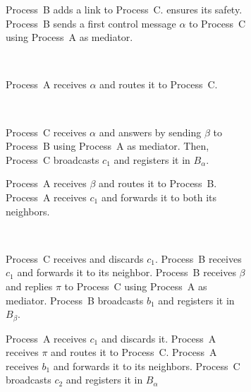 \begin{figure}
  \begin{center}
    \begin{subfigure}[t]{0.31\textwidth}
      \centering%
      \caption{\label{fig:solveA}Process~B adds a link to
        Process~C. \RPCBROADCAST ensures its safety. Process~B sends a first
        control message $\alpha$ to Process~C using Process~A as mediator.}
    \end{subfigure}
    ~
    \begin{subfigure}[t]{0.31\textwidth}
      \centering%
      \caption{\label{fig:solveB}Process~A receives $\alpha$ and routes it to
        Process~C.}
    \end{subfigure}
    ~
    \begin{subfigure}[t]{0.31\textwidth}
      \centering%
      \caption{\label{fig:solveC}Process~C receives $\alpha$ and answers by
        sending $\beta$ to Process~B using Process~A as mediator. Then,
        Process~C broadcasts $c_1$ and registers it in $B_\alpha$.}
    \end{subfigure}
    \begin{subfigure}[t]{0.48\textwidth}
      \centering%
      \caption{\label{fig:solveD}Process~A receives $\beta$ and routes it to
        Process~B.  Process~A receives $c_1$ and forwards it to both its
        neighbors.}
    \end{subfigure}
    ~
    \begin{subfigure}[t]{0.48\textwidth}
      \centering%
      \caption{\label{fig:solveE}Process~C receives and discards $c_1$.
        Process~B receives $c_1$ and forwards it to its neighbor.  Process~B
        receives $\beta$ and replies $\pi$ to Process~C using Process~A as
        mediator. Process~B broadcasts $b_1$ and registers it in $B_\beta$.}
    \end{subfigure}    
    \begin{subfigure}[t]{0.48\textwidth}
      \centering%
      \caption{\label{fig:solveF}Process~A receives $c_1$ and discards it.
        Process~A receives $\pi$ and routes it to Process~C. Process~A receives
        $b_1$ and forwards it to its neighbors. Process~C broadcasts $c_2$ and
        registers it in $B_\alpha$}
    \end{subfigure}
    ~
    \begin{subfigure}[t]{0.48\textwidth}

\end{subfigure}
\end{center}
\end{figure}
